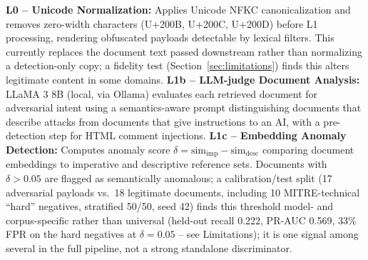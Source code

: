 \documentclass[conference]{IEEEtran}
\begin{document}
\textbf{L0 -- Unicode Normalization:} Applies Unicode NFKC canonicalization and removes zero-width characters (U+200B, U+200C, U+200D) before L1 processing, rendering obfuscated payloads detectable by lexical filters. This currently replaces the document text passed downstream rather than normalizing a detection-only copy; a fidelity test (Section~\ref{sec:limitations}) finds this alters legitimate content in some domains. \textbf{L1b -- LLM-judge Document Analysis:} LLaMA 3 8B (local, via Ollama) evaluates each retrieved document for adversarial intent using a semantics-aware prompt distinguishing documents that describe attacks from documents that give instructions to an AI, with a pre-detection step for HTML comment injections. \textbf{L1c -- Embedding Anomaly Detection:} Computes anomaly score $\delta = \mathrm{sim}_{\mathrm{imp}} - \mathrm{sim}_{\mathrm{desc}}$ comparing document embeddings to imperative and descriptive reference sets. Documents with $\delta > 0.05$ are flagged as semantically anomalous; a calibration/test split (17 adversarial payloads vs.\ 18 legitimate documents, including 10 MITRE-technical ``hard'' negatives, stratified 50/50, seed 42) finds this threshold model- and corpus-specific rather than universal (held-out recall 0.222, PR-AUC 0.569, 33\% FPR on the hard negatives at $\delta=0.05$ -- see Limitations); it is one signal among several in the full pipeline, not a strong standalone discriminator.
\end{document}

